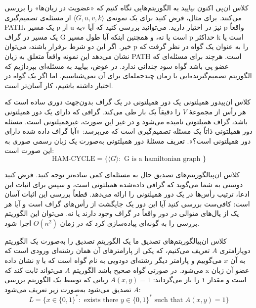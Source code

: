 \begin{itemframe}{کلاس ان‌پی}
\itm
اکنون بیایید به الگوریتم‌هایی نگاه کنیم که «عضویت در زبان‌ها» را بررسی می‌کنند.
برای مثال، فرض کنید برای یک نمونه‌ی
$\langle G, u, v, k \rangle$
از مسئله‌ی تصمیم‌گیری PATH،
یک مسیر p از u بهv نیز در اختیار دارید.
می‌توانید بررسی کنید که آیا p واقعاً یک مسیر در گراف G است یا نه، و همچنین اینکه آیا طول مسیر p حداکثر k است یا خیر.
\itm
اگر این دو شرط برقرار باشند، می‌توان p را به عنوان یک گواه
در نظر گرفت که نشان می‌دهد این نمونه واقعاً متعلق به زبان PATH است.
\itm
هرچند برای مسئله‌ای که عضو پی باشد گواه سود چندانی ندارد.
در عوض، بیایید به مسئله‌ای بپردازیم که الگوریتم تصمیم‌گیرنده‌ایی با زمان چندجمله‌ای برای آن نمی‌شناسیم. اما اگر یک گواه در اختیار داشته باشیم، کار آسان‌تر است.
\end{itemframe}


\begin{itemframe-s}{کلاس ان‌پی}{دور همیلتونی}
\itm
یک دور همیلتونی در یک گراف بدون‌جهت دوری ساده است که هر رأس از مجموعهٔ $V$ را دقیقاً یک بار طی می‌کند.
گرافی که دارای یک دور همیلتونی باشد، گراف همیلتونی
 نامیده می‌شود و در غیر این صورت، غیرهمیلتونی
 است.
\itm
مسئله دور همیلتونی ذاتاً یک مسئله تصمیم‌گیری است که می‌پرسد: «آیا گراف داده شده دارای دور همیلتونی است؟». تعریف مسئلهٔ دور همیلتونی به‌صورت یک زبان رسمی صوری به این صورت است:
$$
\text{HAM-CYCLE} = \{ \langle G \rangle : \text{ G is a hamiltonian graph } \}
$$
\end{itemframe-s}


\begin{itemframe-s}{کلاس ان‌پی}{الگوریتم‌های تصدیق}
\itm
حال به مسئله‌ای کمی ساده‌تر توجه کنید. فرض کنید دوستی به شما می‌گوید که گرافی داده‌شده همیلتونی است، و سپس برای اثبات این ادعا، ترتیب رأس‌ها در یک دور همیلتونی را ارائه می‌دهد.
\itm
قطعاً بررسی این اثبات آسان است: کافی‌ست بررسی کنید آیا این دور یک جایگشت از رأس‌های گراف است و آیا هر یک از یال‌های متوالی در دور واقعاً در گراف وجود دارند یا نه.
\itm
می‌توان این الگوریتم بررسی را به گونه‌ای پیاده‌سازی کرد که در زمان
$O(n^2)$
 اجرا شود.
\end{itemframe-s}


\begin{itemframe-s}{کلاس ان‌پی}{الگوریتم‌های تصدیق}
\itm
ما یک الگوریتم تصدیق
 را به‌صورت یک الگوریتم دوپارامتری $A$ تعریف می‌کنیم، که یکی از پارامترهای آن همان رشته‌ای ورودی است که به آن $x$ می‌گوییم و پارامتر دیگر رشته‌ای دودویی به نام گواه
 است که با $y$ نشان داده می‌شود.
\itm
در صورتی گواه صحیح باشد الگوریتم $A$ می‌تواند ثابت کند که x عضو آن زبان است و مقدار ۱ را باز می‌گرداند:
$A(x, y) = 1$
\itm
زبانی که توسط یک الگوریتم بررسی $A$ تصدیق می‌شود به‌صورت زیر تعریف می‌شود:
$$
L = \{ x \in \{0, 1\}^* :\text{ exists there }  y \in \{0, 1\}^* \text{ such that } A(x, y) = 1 \}
$$
\end{itemframe-s}



